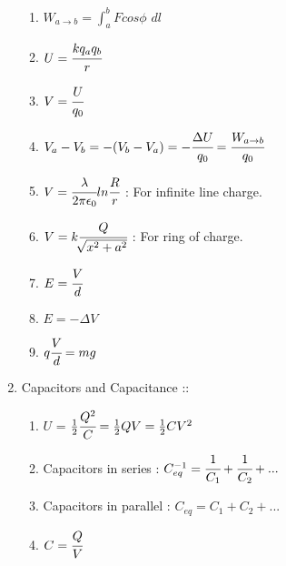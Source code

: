 \documentclass[12pt]{article}
\begin{document}
\begin{enumerate}
\begin{enumerate}
		\item[] $W_{a \rightarrow b} = \int_a^b Fcos\phi$ $dl$
		\item[] $U = \cfrac{kq_aq_b}{r}$	
		\item[] $V = \cfrac{U}{q_0}$
		\item[] $V_a - V_b = -(V_b - V_a) = -\cfrac{\Delta U}{q_0} = \cfrac{W_{a \rightarrow b}}{q_0}$
		\item[] $V = \cfrac{\lambda}{2\pi \epsilon_0}ln\cfrac{R}{r}$ : For infinite line charge.
		\item[] $V = k\cfrac{Q}{\sqrt[]{x^2 + a^2}}$ : For ring of charge.
		\item[] $E = \cfrac{V}{d}$
		\item[] $E = -\Delta V$
		\item[] $q\cfrac{V}{d} = mg$ \\
	\end{enumerate}
	\item[] Capacitors and Capacitance :: 
	\begin{enumerate}
		\item[] $U$ = $\frac{1}{2}\cfrac{Q^2}{C} = \frac{1}{2}QV = \frac{1}{2}CV^2$
		\item[] Capacitors in series : $C_{eq}^{-1} = \cfrac{1}{C_1} + \cfrac{1}{C_2} + ...$
		\item[] Capacitors in parallel : $C_{eq} = C_1 + C_2 + ...$
		\item[] $C = \cfrac{Q}{V}$
	\end{enumerate}
\end{enumerate}
\end{document}
